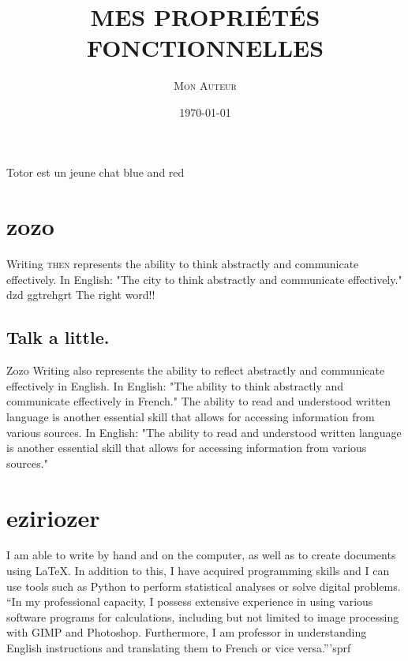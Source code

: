 \documentclass{article}
\title{\MakeUppercase{\textsc{Mes Propriétés Fonctionnelles}}}
\author{\textsc{Mon Auteur}}
\date{\today}
\begin{document}
\maketitle

Totor est un jeune chat blue and red



\section{zozo}

Writing \textsc{then} represents the ability to think abstractly and communicate effectively. In English: "The city to think abstractly and communicate effectively." dzd ggtrehgrt The right word!!

\subsection{Talk a little.}
Zozo Writing also represents the ability to reflect abstractly and communicate effectively in English. In English: "The ability to think abstractly and communicate effectively in French." The ability to read and understood written language is another essential skill that allows for accessing information from various sources. In English: "The ability to read and understood written language is another essential skill that allows for accessing information from various sources."


\section{eziriozer}

I am able to write by hand and on the computer, as well as to create documents using LaTeX. In addition to this, I have acquired programming skills and I can use tools such as Python to perform statistical analyses or solve digital problems. ``In my professional capacity, I possess extensive experience in using various software programs for calculations, including but not limited to image processing with GIMP and Photoshop. Furthermore, I am professor in understanding English instructions and translating them to French or vice versa.'''sprf
\end{document}

